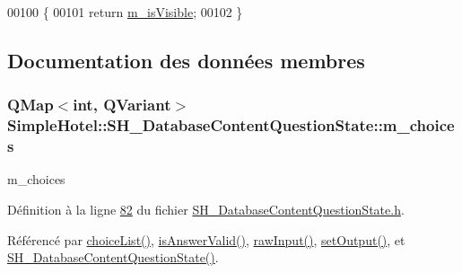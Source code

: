 \begin{DoxyCode}
00100                                \{
00101     \textcolor{keywordflow}{return} \hyperlink{classSimpleHotel_1_1SH__InOutState_a041ad53f3cdfb1b18ee002597e833848}{m\_isVisible};
00102 \}
\end{DoxyCode}


\subsection{Documentation des données membres}
\hypertarget{classSimpleHotel_1_1SH__DatabaseContentQuestionState_ac0e291d1e20d22aabc6887032e516203}{
\subsubsection[{m\-\_\-choices}]{\setlength{\rightskip}{0pt plus 5cm}Q\-Map$<$int, Q\-Variant$>$ Simple\-Hotel\-::\-S\-H\-\_\-\-Database\-Content\-Question\-State\-::m\-\_\-choices\hspace{0.3cm}{\ttfamily [private]}}}\label{classSimpleHotel_1_1SH__DatabaseContentQuestionState_ac0e291d1e20d22aabc6887032e516203}


m\-\_\-choices 



Définition à la ligne \hyperlink{SH__DatabaseContentQuestionState_8h_source_l00082}{82} du fichier \hyperlink{SH__DatabaseContentQuestionState_8h_source}{S\-H\-\_\-\-Database\-Content\-Question\-State.\-h}.



Référencé par \hyperlink{classSimpleHotel_1_1SH__DatabaseContentQuestionState_a86e7bfe0585fc6c63fef4db80247221e}{choice\-List()}, \hyperlink{classSimpleHotel_1_1SH__DatabaseContentQuestionState_aafab321e3b2db8fd4f311040d37b0e1e}{is\-Answer\-Valid()}, \hyperlink{classSimpleHotel_1_1SH__DatabaseContentQuestionState_af7b1002ee7209e3e8238a5e11fd0294b}{raw\-Input()}, \hyperlink{classSimpleHotel_1_1SH__DatabaseContentQuestionState_ab85498797a0318417580ad3f274b018a}{set\-Output()}, et \hyperlink{classSimpleHotel_1_1SH__DatabaseContentQuestionState_a91df6c69a129ca799d29610b3332747d}{S\-H\-\_\-\-Database\-Content\-Question\-State()}.

